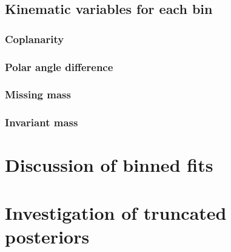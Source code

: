 \section{Kinematic variables for each bin}
\subsection{Coplanarity}
\subsection{Polar angle difference}
\subsection{Missing mass}
\subsection{Invariant mass}
\chapter{Discussion of binned fits}
\label{app:binnedfits}
\chapter{Investigation of truncated posteriors}
\label{app:trunc}